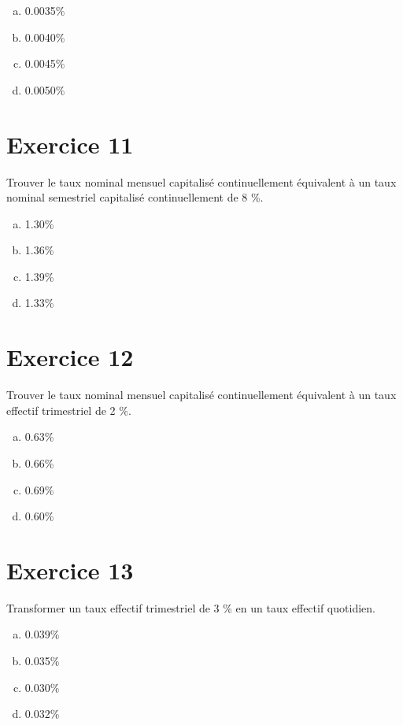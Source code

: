 \documentclass[10pt,a4paper]{article}
\begin{document}
\begin{enumerate}[a)]
\item 0.0035\%
\item 0.0040\%
\item 0.0045\%
\item 0.0050\%
\end{enumerate}


\section*{Exercice 11}
Trouver le taux nominal mensuel capitalisé continuellement équivalent à un taux nominal semestriel capitalisé continuellement de 8 \%.



\begin{enumerate}[a)]
\item 1.30\%
\item 1.36\%
\item 1.39\%
\item 1.33\%
\end{enumerate}

\section*{Exercice 12}
Trouver le taux nominal mensuel capitalisé continuellement équivalent à un taux effectif trimestriel de 2 \%.




\begin{enumerate}[a)]
\item 0.63\%
\item 0.66\%
\item 0.69\%
\item 0.60\%
\end{enumerate}


\section*{Exercice 13}
Transformer un taux effectif trimestriel de 3 \% en un taux effectif quotidien.



\begin{enumerate}[a)]
\item 0.039\%
\item 0.035\%
\item 0.030\%
\item 0.032\%
\end{enumerate}
\end{document}
